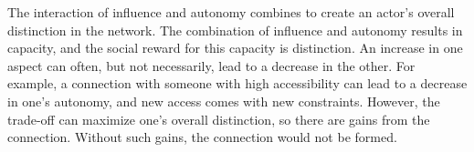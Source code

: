 \documentclass[12pt]{article}
\begin{document}





The interaction of influence and autonomy combines to create an actor’s overall distinction in the network. The combination of influence and autonomy results in capacity, and the social reward for this capacity is distinction. An increase in one aspect can often, but not necessarily, lead to a decrease in the other. For example, a connection with someone with high accessibility can lead to a decrease in one’s autonomy, and new access comes with new constraints. However, the trade-off can maximize one’s overall distinction, so there are gains from the connection. Without such gains, the connection would not be formed.

\newpage


\newpage


\end{document}
